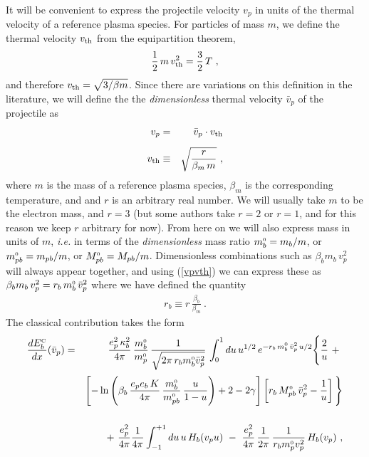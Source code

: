\documentclass[preprint,12pt,eqsecnum,nofootinbib,amsmath,amssymb]{revtex4}
\newcommand{\smC}{{\rm\scriptscriptstyle C}}
\newcommand{\smO}{{\rm\scriptscriptstyle 0}}
\begin{document}
It will be convenient to express the projectile velocity $v_p$ 
in units of the thermal velocity of a reference plasma species. 
For particles of mass $m$, we define the thermal velocity 
$v_{\rm th}$ from the equipartition theorem, 
\begin{eqnarray}
  \frac{1}{2}\, m \, v_{\rm th}^2 =
  \frac{3}{2}\, T \ ,
\end{eqnarray}
and therefore $v_{\rm th}=\sqrt{3/\beta m}$. 
Since there are variations on this definition
in the literature, we will define the the 
{\em dimensionless} thermal velocity $\bar v_p$ 
of the projectile as
\begin{eqnarray}
\label{vpvth}
  v_p 
  &=& \bar v_p \cdot v_{\rm th} 
\\[5pt]
  v_{\rm th} 
  &\equiv& \sqrt{\frac{r}{\beta_m\, m}} \ ,
\end{eqnarray}
where $m$ is the mass of a reference plasma species, $\beta_m$ 
is the corresponding temperature, and and $r$ is an arbitrary 
real number. We will usually take $m$ to be the electron mass, 
and $r=3$ (but some authors take $r=2$ or $r=1$, and for this 
reason we keep $r$ arbitrary for now). From here on we will 
also express mass in units of $m$, {\em i.e.} in terms of 
the {\em dimensionless} mass ratio $m_b^\smO = m_b/m$, or 
$m_{pb}^\smO=m_{pb}/m$, or $M_{pb}^\smO=M_{pb}/m$. Dimensionless 
combinations such as  $\beta_b m_b \, v_p^2$ will always appear 
together, and using (\ref{vpvth}) we can express these as 
$\beta_b m_b \, v_p^2 = r_b\, m_b^\smO \,\bar v_p^2$ where 
we have defined the quantity 
\begin{eqnarray}
\label{rbdef}   
  r_b \equiv r \, \frac{\beta_b}{\beta_m} \ .
\end{eqnarray}
The classical contribution takes the form
\begin{eqnarray}
  {dE^\smC_b \over dx}(\bar v_p) &=&
  \frac{e_p^2 \, \kappa^2_b}{4\pi} \, 
  \frac{m_b^\smO}{m_p^\smO} \,
  \frac{1}{\sqrt{2\pi\, r_b m_b^\smO \bar v_p^2}} \,
  \int_0^1 du \, u^{1/2} \,e^{ -r_b\, m_b^\smO \,\bar 
  v_p^2 \, u/2 }\Bigg\{ \frac{2}{u} ~+~
\nonumber\\[2 pt]
  && 
  \left[ - \ln
  \left(\beta_b\,  { e_p e_b \, K \over 4 \pi}\, 
  { m_b^\smO \over m_{pb}^\smO } \, { u \over 1-u} \right)  
  + 2 - 2\gamma \right]\left[  r_b \, M_{pb}^\smO \, 
  \bar v_p^2 -  {1\over u} \right] \Bigg\} 
\nonumber\\[15pt]
  && 
  + ~ {e_p^2 \over 4 \pi } { 1 \over 4 \pi }
  \int_{-1}^{+1} du \, u \,H_b(v_p u) 
  ~-~\frac{e_p^2}{4 \pi }\, \frac{1}{2\pi}\,
  \frac{1}{r_b m_p^\smO v_p^2} \, H_b(v_p) \ ,
\end{eqnarray}
\end{document}
